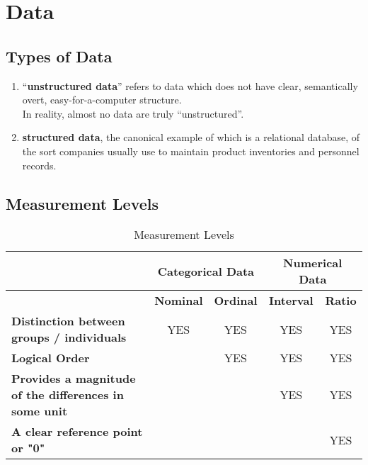 \chapter{Data}

\section{Types of Data \cite{ir-1}}
\begin{enumerate}
    \item “\textbf{unstructured data}” refers to data which does not have clear, semantically overt, easy-for-a-computer structure.\\
    In reality, almost no data are truly “unstructured”.

    \item \textbf{structured data}, the canonical example of which is a relational database, of the sort companies usually use to maintain product inventories and personnel records.
\end{enumerate}


\section{Measurement Levels \cite{ism-1}} \label{measurement_levels}
\begin{table}[h!]
    \centering
    \begin{tabular}{|p{5cm}|c|c|c|c|}
        \hline
        & \multicolumn{2}{c|}{\textbf{Categorical Data}} & \multicolumn{2}{c|}{\textbf{Numerical Data}} \\ \hline
        
        & \textbf{Nominal} & \textbf{Ordinal} & \textbf{Interval} & \textbf{Ratio} \\ \hline
        
        \textbf{Distinction between groups / individuals} & YES & YES & YES & YES \\ \hline
        
        \textbf{Logical Order} & & YES & YES & YES \\ \hline
        
        \textbf{Provides a magnitude of the differences in some unit} & & & YES & YES \\ \hline
        
        \textbf{A clear reference point or "0"} & & & & YES \\ \hline
    \end{tabular}
    \caption{Measurement Levels}
    \label{tab:data_comparison}
\end{table}

